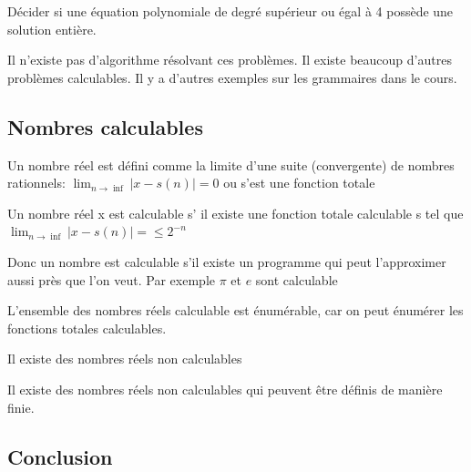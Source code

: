 \begin{mydef} Décider si une équation 
	polynomiale de degré supérieur ou égal à 4 possède une solution entière.
\end{mydef}

Il n'existe pas d'algorithme résolvant ces problèmes. Il existe beaucoup
d'autres problèmes calculables. Il y a d'autres exemples sur les grammaires dans le cours.

\subsection{Nombres calculables}
\label{sub:nombres_calculables}

\begin{mydef}
	Un nombre réel est défini comme la limite d'une suite (convergente) de 
	nombres rationnels: $\lim_{n \rightarrow \inf} |x-s(n)| = 0 $ ou s’est 
	une fonction totale
\end{mydef}

\begin{mydef}
	Un nombre réel x est calculable s’ il existe une fonction totale 
	calculable s tel que $\lim_{n \rightarrow \inf} |x-s(n)| =\leq 2^{-n}$
\end{mydef}

\begin{myrem}
	Donc un nombre est calculable s'il existe un programme qui peut 
	l'approximer aussi près que l'on veut. Par exemple $\pi$ et $e$ sont 
	calculable
\end{myrem}

\begin{myprop}
	L'ensemble des nombres réels calculable est énumérable, car on peut énumérer les 
	fonctions totales calculables.	
\end{myprop}

\begin{myprop}
	Il existe des nombres réels non calculables
\end{myprop}

\begin{myprop}
	Il existe des nombres réels non calculables qui peuvent être définis de 
	manière finie.
\end{myprop}


\subsection{Conclusion}


